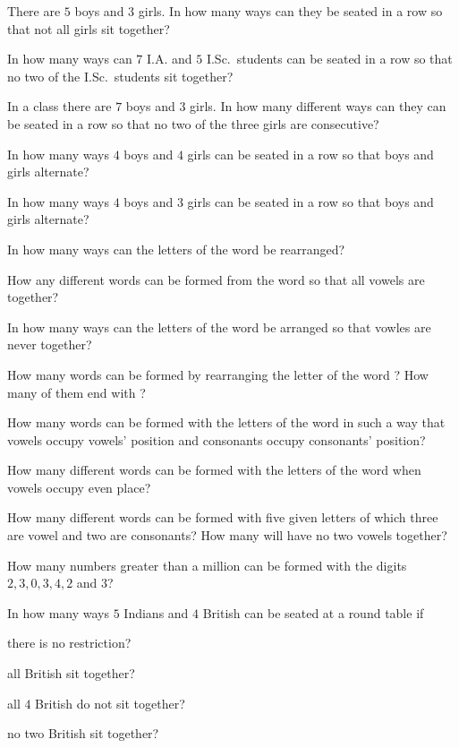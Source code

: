 \item There are $5$ boys and $3$ girls. In how many ways can they be seated in a row so that not all girls sit together?
\item In how many ways can $7$ I.A. and $5$ I.Sc.\ students can be seated in a row so that no two of the I.Sc.\ students sit
  together?
\item In a class there are $7$ boys and $3$ girls. In how many different ways can they can be seated in a row so that no two of the
  three girls are consecutive?
\item In how many ways $4$ boys and $4$ girls can be seated in a row so that boys and girls alternate?
\item In how many ways $4$ boys and $3$ girls can be seated in a row so that boys and girls alternate?
\item In how many ways can the letters of the word  be rearranged?
\item How any different words can be formed from the word  so that all vowels are together?
\item In how many ways can the letters of the word  be arranged so that vowles are never together?
\item How many words can be formed by rearranging the letter of the word ? How many of them end with ?
\item How many words can be formed with the letters of the word  in such a way that vowels occupy vowels' position
  and consonants occupy consonants' position?
\item How many different words can be formed with the letters of the word  when vowels occupy even place?
\item How many different words can be formed with five given letters of which three are vowel and two are consonants? How many will
  have no two vowels together?
\item How many numbers greater than a million can be formed with the digits $2, 3, 0, 3, 4, 2$ and $3$?
\item In how many ways $5$ Indians and $4$ British can be seated at a round table if
  \startitemize[i]
    \item there is no restriction?
    \item all British sit together?
    \item all $4$ British do not sit together?
    \item no two British sit together?
